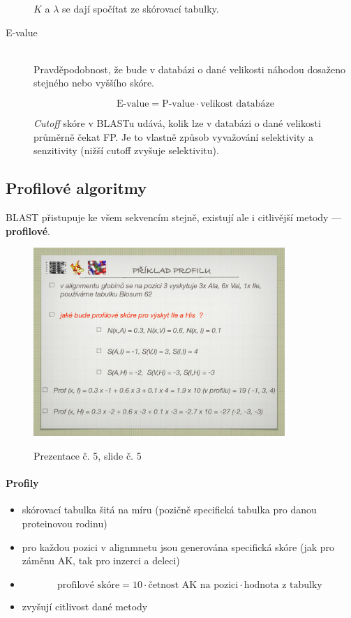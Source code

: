 \documentclass[DIV=8]{scrreprt}
\begin{document}
\begin{description}
\(K\) a \(\lambda\) se dají spočítat ze skórovací tabulky.


\item[E-value]\hfill \\
Pravděpodobnost, že bude v databázi o dané velikosti náhodou dosaženo stejného nebo vyššího skóre.

\[\text{E-value} = \text{P-value} \cdot \text{velikost databáze}\]

\emph{Cutoff} skóre v BLASTu udává, kolik lze v databázi o dané velikosti průměrně čekat FP. Je to vlastně způsob vyvažování selektivity a senzitivity (nižší cutoff zvyšuje selektivitu).

\end{description}


\subsection{Profilové algoritmy} \label{Profilové algoritmy}


BLAST přistupuje ke všem sekvencím stejně, existují ale i citlivější metody --- \textbf{profilové}.

\begin{figure}
    \caption{Prezentace č. 5, slide č. 5}
    \includegraphics[width=0.85\textwidth]{slides-5/slide-5.jpg}
    \centering
    \label{slides-5-slide-5}
\end{figure}

\paragraph{Profily}
\begin{itemize}[nosep]
    \item skórovací tabulka šitá na míru (pozičně specifická tabulka pro danou proteinovou rodinu)
    \item pro každou pozici v alignmnetu jsou generována specifická skóre (jak pro záměnu AK, tak pro inzerci a deleci)
    \item \[\text{profilové skóre} = 10 \cdot \text{četnost AK na pozici} \cdot \text{hodnota z tabulky}\]
    \item zvyšují citlivost dané metody
\end{itemize}
\end{document}
